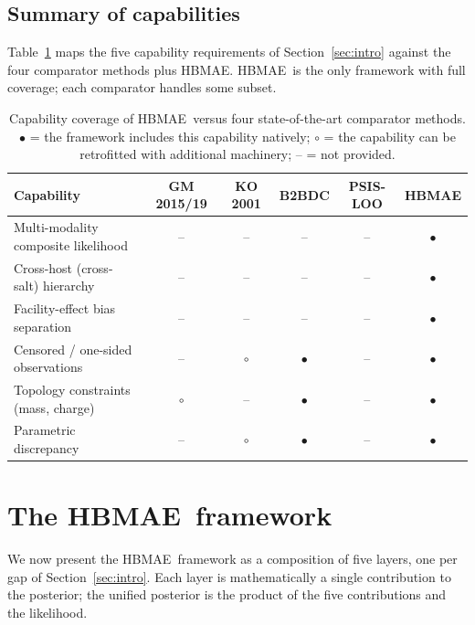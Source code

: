 \documentclass[12pt]{article}
\theoremstyle{plain}
\theoremstyle{definition}
\theoremstyle{remark}
\newcommand{\HBMAE}{HBMAE\xspace}
\begin{document}
\subsection{Summary of capabilities}\label{sec:sota:summary}

Table~\ref{tab:sota_capabilities} maps the five capability requirements of
Section~\ref{sec:intro} against the four comparator methods plus \HBMAE.
\HBMAE\ is the only framework with full coverage; each comparator handles
some subset.

\begin{table}[ht]\centering
\caption{Capability coverage of \HBMAE\ versus four state-of-the-art
comparator methods.  $\bullet$ = the framework includes this capability
natively; $\circ$ = the capability can be retrofitted with additional
machinery; -- = not provided.}
\label{tab:sota_capabilities}
\small
\begin{tabular}{lccccc}
\toprule
Capability & GM 2015/19 & KO 2001 & B2BDC & PSIS-LOO & \HBMAE \\
\midrule
Multi-modality composite likelihood & --      & --      & --      & --      & $\bullet$ \\
Cross-host (cross-salt) hierarchy   & --      & --      & --      & --      & $\bullet$ \\
Facility-effect bias separation     & --      & --      & --      & --      & $\bullet$ \\
Censored / one-sided observations   & --      & $\circ$ & $\bullet$ & --     & $\bullet$ \\
Topology constraints (mass, charge) & $\circ$ & --      & $\bullet$ & --     & $\bullet$ \\
Parametric discrepancy              & --      & $\circ$ & $\bullet$ & --     & $\bullet$ \\
\bottomrule
\end{tabular}
\end{table}

\section{The \HBMAE\ framework}\label{sec:framework}

We now present the \HBMAE\ framework as a composition of five layers, one
per gap of Section~\ref{sec:intro}.  Each layer is mathematically a single
contribution to the posterior; the unified posterior is the product
of the five contributions and the likelihood.
\end{document}
